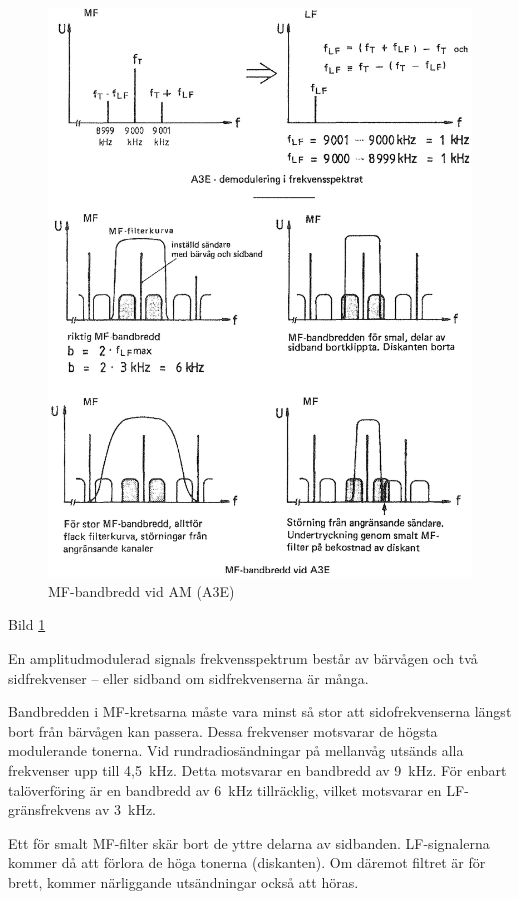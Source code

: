 \begin{figure}
  \includegraphics[width=\textwidth]{images/cropped_pdfs/bild_2_4-26.pdf}
  \caption{MF-bandbredd vid AM (A3E)}
  \label{fig:bildII4-26}
\end{figure}

Bild \ref{fig:bildII4-26}

En amplitudmodulerad signals frekvensspektrum består av bärvågen och
två sidfrekvenser -- eller sidband om sidfrekvenserna är många.

Bandbredden i MF-kretsarna måste vara minst så stor att
sidofrekvenserna längst bort från bärvågen kan passera. Dessa
frekvenser motsvarar de högsta modulerande tonerna.
Vid rundradiosändningar på mellanvåg utsänds alla frekvenser upp till 4,5~kHz.
Detta motsvarar en bandbredd av 9~kHz. För enbart talöverföring
är en bandbredd av 6~kHz tillräcklig, vilket motsvarar en
LF-gränsfrekvens av 3~kHz.

Ett för smalt MF-filter skär bort de yttre delarna av
sidbanden. LF-signalerna kommer då att förlora de höga tonerna
(diskanten). Om däremot filtret är för brett, kommer närliggande
utsändningar också att höras.

